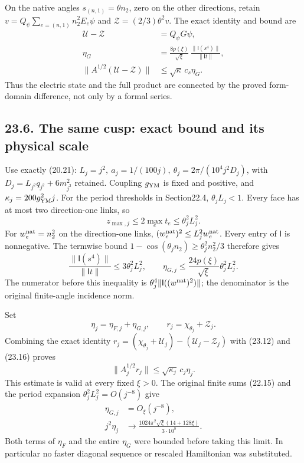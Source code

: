 \documentclass[
]{article}
\begin{document}
On the native angles \(s_{(n,1)}=\theta n_2\), zero on the other
directions, retain \(v=Q_\psi\sum_{e=(n,1)}n_2^2E_e\psi\) and
\(\mathcal Z=(2/3)\theta^2v\). The exact identity and bound are \[
\begin{aligned}
\mathcal U-\mathcal Z&=Q_\psi G\psi,\\
\eta_G&=\frac{8p(\xi)}{\sqrt\xi}\,
                 \frac{\|\mathsf I(s^4)\|}{\|\mathsf It\|},\\
\|A^{1/2}(\mathcal U-\mathcal Z)\|
 &\le\sqrt\kappa\,c_s\eta_G .
\end{aligned}\tag{23.16}
\] Thus the electric state and the full product are connected by the
proved form-domain difference, not only by a formal series.

\subsection{23.6. The same cusp: exact bound and its physical
scale}\label{the-same-cusp-exact-bound-and-its-physical-scale}

Use exactly (20.21): \(L_j=j^2,\ a_j=1/(100j),\
\theta_j=2\pi/(10^4j^2D_j)\), with \(D_j=L_{j^2}q_{j^2}+6m_{j^2}^2\)
retained. Coupling \(g_{\rm YM}\) is fixed and positive, and
\(\kappa_j=200g_{\rm YM}^2j\). For the period thresholds in Section22.4,
\(\theta_jL_j<1\). Every face has at most two direction-one links, so \[
z_{\max,j}\le2\max_e t_e\le\theta_j^2L_j^2.
\] For \(w^{\rm nat}_e=n_2^2\) on the direction-one links,
\((w^{\rm nat}_e)^2\le L_j^2w^{\rm nat}_e\). Every entry of
\(\mathsf I\) is nonnegative. The termwise bound
\(1-\cos(\theta_jn_2)\ge\theta_j^2n_2^2/3\) therefore gives \[
\frac{\|\mathsf I(s^4)\|}{\|\mathsf It\|}
 \le3\theta_j^2L_j^2,\qquad
\eta_{G,j}\le\frac{24p(\xi)}{\sqrt\xi}\theta_j^2L_j^2.
\tag{23.17}
\] The numerator before this inequality is
\(\theta_j^4\|\mathsf I((w^{\rm nat})^2)\|\); the denominator is the
original finite-angle incidence norm.

Set \[
\eta_j=\eta_{F,j}+\eta_{G,j},\qquad
r_j=\chi_{\theta_j}+\mathcal Z_j.
\] Combining the exact identity \(r_j=(\chi_{\theta_j}+\mathcal U_j)
       -(\mathcal U_j-\mathcal Z_j)\) with (23.12) and (23.16) proves \[
\boxed{\ \|A_j^{1/2}r_j\|\le\sqrt{\kappa_j}\,c_j\eta_j.\ }
\tag{23.18}
\] This estimate is valid at every fixed \(\xi>0\). The original finite
sums (22.15) and the period expansion \(\theta_j^2L_j^2=O(j^{-8})\) give
\[
\begin{aligned}
\eta_{G,j}&=O_\xi(j^{-8}),\\
j^2\eta_j&\longrightarrow
\frac{1024\pi^2\sqrt\xi(14+128\xi)}{3\cdot10^8}.
\end{aligned}\tag{23.19}
\] Both terms of \(\eta_F\) and the entire \(\eta_G\) were bounded
before taking this limit. In particular no faster diagonal sequence or
rescaled Hamiltonian was substituted.
\end{document}
